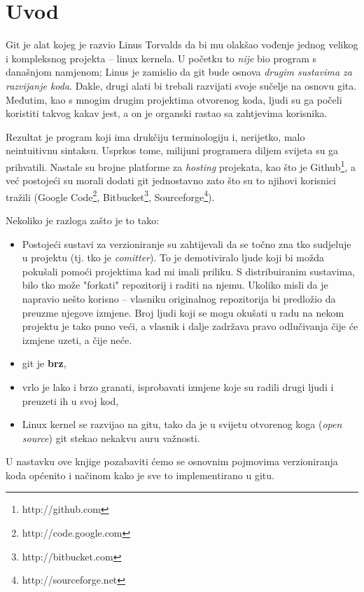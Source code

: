 \chapter*{Uvod}

Git je alat kojeg je razvio Linus Torvalds da bi mu olakšao vođenje jednog velikog i kompleksnog projekta -- linux kernela.
U početku to \emph{nije} bio program s današnjom namjenom; Linus je zamislio da git bude osnova \emph{drugim sustavima za razvijanje koda}.
Dakle, drugi alati bi trebali razvijati svoje sučelje na osnovu gita.
Međutim, kao s mnogim drugim projektima otvorenog koda, ljudi su ga počeli koristiti takvog kakav jest, a on je organski rastao sa zahtjevima korisnika.

Rezultat je program koji ima drukčiju terminologiju i, nerijetko, malo neintuitivnu sintaksu.
Usprkos tome, milijuni programera diljem svijeta su ga prihvatili. 
Nastale su brojne platforme za \emph{hosting} projekata, kao što je Github\footnote{http://github.com}, a već postojeći su morali dodati git jednostavno zato što su to njihovi korisnici tražili (Google Code\footnote{http://code.google.com}, Bitbucket\footnote{http://bitbucket.com}, Sourceforge\footnote{http://sourceforge.net}).

Nekoliko je razloga zašto je to tako:

\begin{itemize}
	\item Postojeći sustavi za verzioniranje su zahtijevali da se točno zna tko sudjeluje u projektu (tj. tko je \emph{comitter}). To je demotiviralo ljude koji bi možda pokušali pomoći projektima kad mi imali priliku. S distribuiranim sustavima, bilo tko može "forkati" repozitorij i raditi na njemu. Ukoliko misli da je napravio nešto korisno -- vlasniku originalnog repozitorija bi predložio da preuzme njegove izmjene. Broj ljudi koji se mogu okušati u radu na nekom projektu je tako puno veći, a vlasnik i dalje zadržava pravo odlučivanja čije će izmjene uzeti, a čije neće.
	\item git je \textbf{brz},
	\item vrlo je lako i brzo granati, isprobavati izmjene koje su radili drugi ljudi i preuzeti ih u svoj kod,
	\item Linux kernel se razvijao na gitu, tako da je u svijetu otvorenog koga (\emph{open source}) git stekao nekakvu auru važnosti.
\end{itemize}

U nastavku ove knjige pozabaviti ćemo se osnovnim pojmovima verzioniranja koda općenito i načinom kako je sve to implementirano u gitu.

